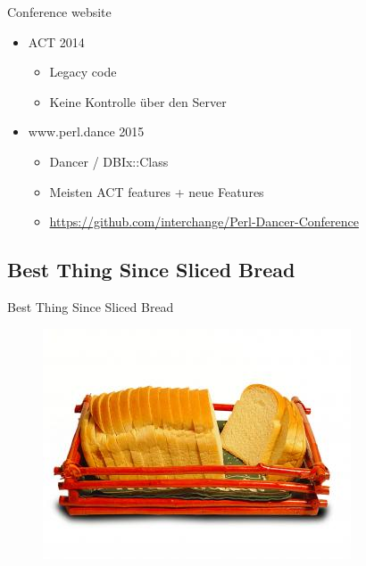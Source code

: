 
\begin{frame}[fragile]{Conference website}
\begin{itemize}
\item ACT 2014
\begin{itemize}
\item Legacy code
\item Keine Kontrolle über den Server
\end{itemize}
\item www.perl.dance 2015
\begin{itemize}
\item Dancer / DBIx::Class
\item Meisten ACT features + neue Features
\item \url{https://github.com/interchange/Perl-Dancer-Conference}
\end{itemize}
\end{itemize}
\end{frame}

\subsection{Best Thing Since Sliced Bread}

\begin{frame}{Best Thing Since Sliced Bread}


\begin{figure}[!ht]
\centering
\includegraphics[width=1\linewidth]{img/sliced-bread.jpg}
\end{figure}
\end{frame}

